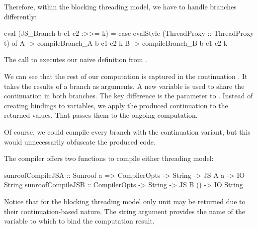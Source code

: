 Therefore, within the blocking 
threading model, we have to handle branches differently:
\begin{Code}
eval (JS_Branch b c1 c2 :>>= k) = 
  case evalStyle (ThreadProxy :: ThreadProxy t) of
    A -> compileBranch_A b c1 c2 k
    B -> compileBranch_B b c1 c2 k
\end{Code}
The call to 
executes our naive definition from .
We can see that the rest of our computation is captured in the
continuation . It takes the results of a branch
as arguments. A new variable  is used to share
the continuation in both branches.
The key difference is the parameter to . Instead
of creating bindings to variables, we apply the produced
continuation to the returned values. That passes them to the 
ongoing computation.
\begin{comment}
\begin{Code}
var v11 = function() {
  var v2 = function(v0) { CallAfterIf(v0); };
  if(true){
    var v5 = function(v3) { v2(v3); };
    /* True Case */
    v5(true);
  } else {
    var v9 = function(v7) { v2(v7); };
    /* False Case */
    v9(false);
  }
};
v11();
\end{Code}
We can see that the function call after the branch is captured by the 
continuation \Src{v2} and that continuation is called with the 
return values as parameters inside each branch.
\end{comment}
%
Of course, we could compile every branch with the 
continuation variant, but this would unnecessarily
obfuscate the produced code. %

The compiler offers two functions to compile either threading 
model:
\begin{Code}
sunroofCompileJSA :: Sunroof a 
                  => CompilerOpts -> String -> JS A a  -> IO String
sunroofCompileJSB :: CompilerOpts -> String -> JS B () -> IO String
\end{Code}
Notice that for the blocking threading model only unit
may be returned due to their continuation-based nature. 
The string argument provides the name of the variable to which to
bind the computation result.









